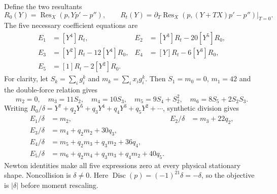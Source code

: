 \documentclass[11pt]{article}
\theoremstyle{remark}
\numberwithin{equation}{section}
\begin{document}
Define the two resultants
\[
 R_0(Y)=\operatorname{Res}_X(p,Yp'-p''),\qquad
 R_t(Y)=\left.\partial_T\operatorname{Res}_X
 (p,(Y+TX)p'-p'')\right|_{T=0}.
\]
The five necessary coefficient equations are
\begin{align*}
 E_1&=[Y^4]R_t,&E_2&=[Y^3]R_t-20[Y^5]R_0,\\
 E_3&=[Y^2]R_t-12[Y^4]R_0,
 &E_4&=[Y]R_t-6[Y^3]R_0,\\
 E_5&=[1]R_t-2[Y^2]R_0.
\end{align*}
For clarity, let $S_k=\sum_i g_i^k$ and $m_k=\sum_i x_i g_i^k$.
Then $S_1=m_0=0$, $m_1=42$ and the double-force relation gives
\[
 m_2=0,\quad m_3=11S_2,\quad m_4=10S_3,\quad
 m_5=9S_4+S_2^2,\quad m_6=8S_5+2S_2S_3.
\]
Writing $R_0/\delta=Y^7+q_2Y^5+q_3Y^4+q_4Y^3+q_5Y^2+\cdots$,
synthetic division gives
\begin{align*}
 E_1/\delta&=m_2,&E_2/\delta&=m_3+22q_2,\\
 E_3/\delta&=m_4+q_2m_2+30q_3,\\
 E_4/\delta&=m_5+q_2m_3+q_3m_2+36q_4,\\
 E_5/\delta&=m_6+q_2m_4+q_3m_3+q_4m_2+40q_5.
\end{align*}
Newton identities make all five expressions zero at every physical
stationary shape. Noncollision is $\delta\ne0$. Here
$\operatorname{Disc}(p)=(-1)^{21}\delta=-\delta$, so the objective is
$|\delta|$ before moment rescaling.
\end{document}
